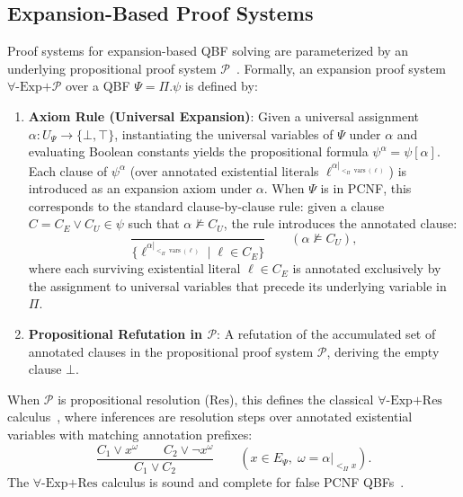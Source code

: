 \documentclass[runningheads]{llncs}
\DeclareMathOperator{\vars}{vars}
\newcommand{\Bool}{\{\bot,\top\}}
\newcommand{\ExpRes}{\forall\text{-}\mathrm{Exp}\text{+}\mathrm{Res}}
\begin{document}
\subsection{Expansion-Based Proof Systems}
\label{subsec:expres}

Proof systems for expansion-based QBF solving are parameterized by an underlying propositional proof system $\mathcal{P}$~\cite{janota2015, ferat}.
Formally, an expansion proof system $\forall\text{-}\mathrm{Exp}\text{+}\mathcal{P}$ over a QBF $\Psi = \Pi.\psi$ is defined by:
\begin{enumerate}
    \item \textbf{Axiom Rule (Universal Expansion)}:
          Given a universal assignment $\alpha : U_\Psi \to \Bool$, instantiating the universal variables of $\Psi$ under $\alpha$ and evaluating Boolean constants yields the propositional formula $\psi^\alpha = \psi[\alpha]$.
          Each clause of $\psi^\alpha$ (over annotated existential literals $\ell^{\alpha|_{<_\Pi \vars(\ell)}}$) is introduced as an expansion axiom under $\alpha$.
          When $\Psi$ is in PCNF, this corresponds to the standard clause-by-clause rule: given a clause $C = C_E \lor C_U \in \psi$ such that $\alpha \not\models C_U$, the rule introduces the annotated clause:
          \begin{equation}
              \frac{}{\{\ell^{\alpha|_{<_\Pi \vars(\ell)}} \mid \ell \in C_E\}} \qquad (\alpha \not\models C_U) ,
          \end{equation}
          where each surviving existential literal $\ell \in C_E$ is annotated exclusively by the assignment to universal variables that precede its underlying variable in $\Pi$.
    \item \textbf{Propositional Refutation in $\mathcal{P}$}:
          A refutation of the accumulated set of annotated clauses in the propositional proof system $\mathcal{P}$, deriving the empty clause $\bot$.
\end{enumerate}

When $\mathcal{P}$ is propositional resolution ($\mathrm{Res}$), this defines the classical $\ExpRes$ calculus~\cite{janota2015}, where inferences are resolution steps over annotated existential variables with matching annotation prefixes:
\begin{equation}
    \frac{C_1 \lor x^\omega \qquad C_2 \lor \neg x^\omega}{C_1 \lor C_2} \qquad (x \in E_\Psi, \; \omega = \alpha|_{<_\Pi x}) .
\end{equation}
The $\ExpRes$ calculus is sound and complete for false PCNF QBFs~\cite{janota2015}.
\end{document}
